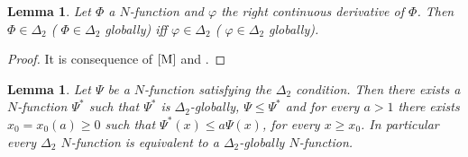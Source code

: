 \documentclass[twoside]{article}
\newtheorem{lem}[thm]{Lemma}
\theoremstyle{remark}
\renewcommand{\leq}{\leqslant}
\renewcommand{\geq}{\geqslant}
\begin{document}
\begin{lem}\label{lema:delta_2 y der} Let $\Phi$ a $N$-function and $\varphi$ the right continuous derivative of $\Phi$. Then $\Phi\in\Delta_2$ (
$\Phi\in\Delta_2$ globally) iff $\varphi\in\Delta_2$ (
$\varphi\in\Delta_2$ globally).
\end{lem}
\begin{proof}  It is consequence of $\cite[Th. 11.7]{M}$ and \cite[Remark 5, p. 87]{M}.

\end{proof}

\begin{lem}\label{lem:delta2-equiv-delta2-global} Let $\Psi$ be a $N$-function satisfying the $\Delta_2$ condition. Then there exists a $N$-function $\Psi^*$  such that $\Psi^*$ is $\Delta_2$-globally, $\Psi\leq\Psi^*$ and for every $a>1$ there exists $x_0=x_0(a)\geq 0$ such that $\Psi^*(x)\leq a\Psi(x)$, for every $x\geq x_0$.  In particular every $\Delta_2$ $N$-function is equivalent to a $\Delta_2$-globally $N$-function.
\end{lem}
\end{document}
